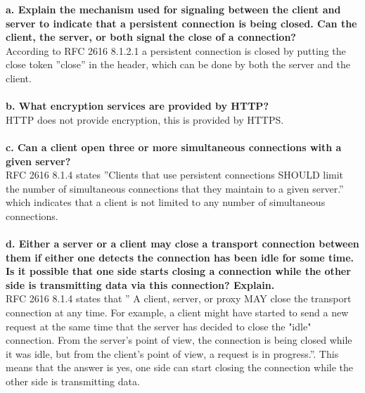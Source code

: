 \textbf{a. Explain the mechanism used for signaling between the client and server to indicate that a persistent connection is being closed. Can the client, the server, or both signal the close of a connection?} \\
According to RFC 2616 8.1.2.1 a persistent connection is closed by putting the close token ''close'' in the header, which can be done by both the server and the client. \\
\\
\textbf{b. What encryption services are provided by HTTP?} \\
HTTP does not provide encryption, this is provided by HTTPS. \\
\\
\textbf{c. Can a client open three or more simultaneous connections with a given server?} \\
RFC 2616 8.1.4 states ''Clients that use persistent connections SHOULD limit the number of
simultaneous connections that they maintain to a given server.'' which indicates that a client is not limited to any number of simultaneous connections. \\
\\
\textbf{d. Either a server or a client may close a transport connection between them if either one detects the connection has been idle for some time. Is it possible that one side starts closing a connection while the other side is transmitting data via this connection? Explain.} \\
RFC 2616 8.1.4 states that '' A client, server, or proxy MAY close the transport connection at any time. For example, a client might have started to send a new request at the same time that the server has decided to close the "idle" connection. From the server's point of view, the connection is being closed while it was idle, but from the client's point of view, a request is in progress.''. This means that the answer is yes, one side can start closing the connection while the other side is transmitting data.


